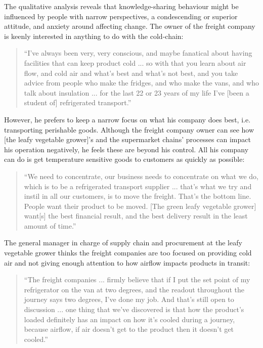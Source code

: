 The qualitative analysis reveals that knowledge-sharing behaviour might be influenced by people with narrow perspectives, a condescending or superior attitude, and anxiety around affecting change. The owner of the freight company is keenly interested in anything to do with the cold-chain:

\begin{quote}
\small
\enquote{I've always been very, very conscious, and maybe fanatical about having facilities that can keep product cold ... so with that you learn about air flow, and cold air and what's best and what’s not best, and you take advice from people who make the fridges, and who make the vans, and who talk about insulation ... for the last 22 or 23 years of my life I've [been a student of] refrigerated transport.} \\
\end{quote}

However, he prefers to keep a narrow focus on what his company does best, i.e. transporting perishable goods. Although the freight company owner can see how [the leafy vegetable grower]'s and the supermarket chains' processes can impact his operation negatively, he feels these are beyond his control. All his company can do is get temperature sensitive goods to customers as quickly as possible:  

\begin{quote}
\small
\enquote{We need to concentrate, our business needs to concentrate on what we do, which is to be a refrigerated transport supplier ... that's what we try and instil in all our customers, is to move the freight. That's the bottom line. People want their product to be moved. [The green leafy vegetable grower] want[s] the best financial result, and the best delivery result in the least amount of time.} \\
\end{quote}

The general manager in charge of supply chain and procurement at the leafy vegetable grower thinks the freight companies are too focused on providing cold air and not giving enough attention to how airflow impacts products in transit:

\begin{quote}
\small
\enquote{The freight companies ... firmly believe that if I put the set point of my refrigerator on the van at two degrees, and the readout throughout the journey says two degrees, I've done my job. And that's still open to discussion ... one thing that we've discovered is that how the product's loaded definitely has an impact on how it's cooled during a journey, because airflow, if air doesn't get to the product then it doesn't get cooled.} \\
\end{quote}

